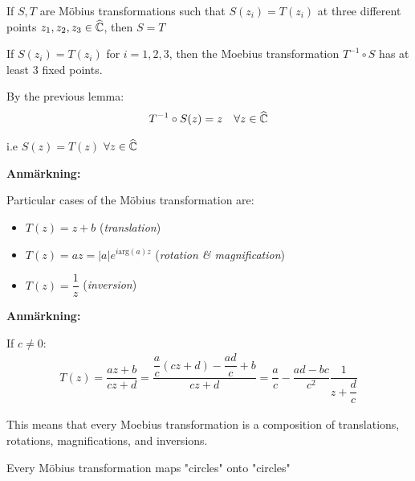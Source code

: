 \par\bigskip
\begin{theo}[]{}
  If $S,T$ are Möbius transformations such that $S(z_i) = T(z_i)$ at three different points $z_1,z_2,z_3\in \widehat{\mathbb{C}}$, then $S = T$
\end{theo}
\par\bigskip
\begin{prf}[]{}
  If $S(z_i) = T(z_i)$ for $i=1,2,3$, then the Moebius transformation $T^{-1}\circ S$ has at least 3 fixed points.\par
  \noindent By the previous lemma:
  \begin{equation*}
    \begin{gathered}
      T^{-1}\circ S(z) = z\quad\forall z\in\widehat{\mathbb{C}}
    \end{gathered}
  \end{equation*}\par
  \noindent i.e $S(z) = T(z)$ $\forall z\in\widehat{\mathbb{C}}$
\end{prf}
\par\bigskip
\noindent\textbf{Anmärkning:}\par
\noindent Particular cases of the Möbius transformation are:\par
\begin{itemize}
  \item $T(z) = z+b$ (\textit{translation})
  \item $T(z) = az = \left|a\right|e^{i\text{arg}(a)z}$ (\textit{rotation \& magnification})
  \item $T(z) = \dfrac{1}{z}$ (\textit{inversion})
\end{itemize}
\par\bigskip
\noindent\textbf{Anmärkning:}\par
\noindent If $c\neq0$:
\begin{equation*}
  \begin{gathered}
    T(z) = \dfrac{az+b}{cz+d} = \dfrac{\dfrac{a}{c}(cz+d)-\dfrac{ad}{c}+b}{cz+d} = \dfrac{a}{c}-\dfrac{ad-bc}{c^2}\dfrac{1}{z+\dfrac{d}{c}}
  \end{gathered}
\end{equation*}\par
\noindent This means that every Moebius transformation is a composition of translations, rotations, magnifications, and inversions. 
\par\bigskip
\begin{theo}[]{}
  Every Möbius transformation maps "circles" onto "circles"
\end{theo}
